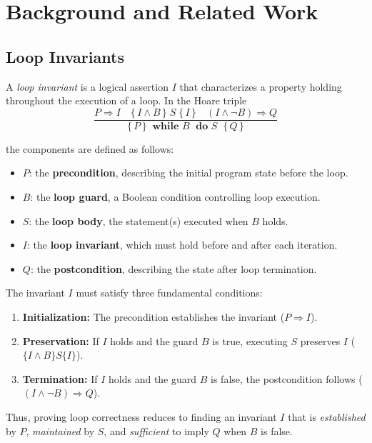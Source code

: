 \section{Background and Related Work}

\subsection{Loop Invariants}

\noindent
A \textit{loop invariant} is a logical assertion $I$ that characterizes a property 
holding throughout the execution of a loop.  
In the Hoare triple
\[
\frac{
   P \Rightarrow I 
   \quad 
   \{\, I \wedge B \,\}\; S \;\{\, I \,\} 
   \quad 
   (I \wedge \lnot B) \Rightarrow Q
}{
   \{\, P \,\}\;\;\textbf{while } B \;\textbf{ do } S\;\;\{\, Q \,\}
}
\]

the components are defined as follows:
\begin{itemize}
    \item $P$: the \textbf{precondition}, describing the initial program state before the loop.
    \item $B$: the \textbf{loop guard}, a Boolean condition controlling loop execution.
    \item $S$: the \textbf{loop body}, the statement(s) executed when $B$ holds.
    \item $I$: the \textbf{loop invariant}, which must hold before and after each iteration.
    \item $Q$: the \textbf{postcondition}, describing the state after loop termination.
\end{itemize}

\noindent
The invariant $I$ must satisfy three fundamental conditions:
\begin{enumerate}
    \item \textbf{Initialization:} The precondition establishes the invariant ($P \Rightarrow I$).  
    \item \textbf{Preservation:} If $I$ holds and the guard $B$ is true, executing $S$ preserves $I$ ($\{ I \wedge B \} S \{ I \}$).  
    \item \textbf{Termination:} If $I$ holds and the guard $B$ is false, the postcondition follows ($(I \wedge \lnot B) \Rightarrow Q$).  
\end{enumerate}

\noindent
Thus, proving loop correctness reduces to finding an invariant $I$ that is 
\textit{established} by $P$, \textit{maintained} by $S$, and \textit{sufficient} to imply $Q$ when $B$ is false.


